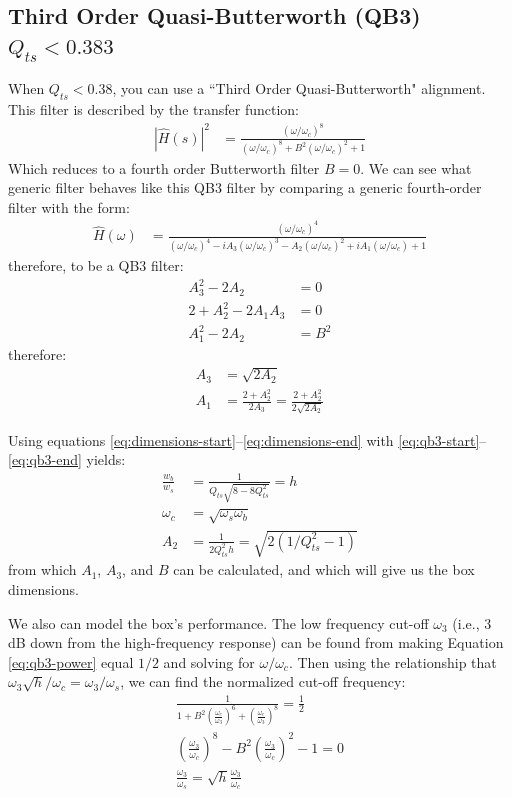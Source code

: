 \documentclass[10pt]{book}
\begin{document}
\subsection{Third Order Quasi-Butterworth (QB3) \texorpdfstring{\\$Q_{ts}<0.383$}{Qts<0.383}} When $Q_{ts}<0.38$, you can use a ``Third Order Quasi-Butterworth" alignment. This filter is described by the transfer function:
\begin{align}
\left| \hat{H}(s) \right|^2 &=\frac{(\omega/\omega_c)^8}{(\omega/\omega_c)^8+B^2(\omega/\omega_c)^2+1}
\end{align}
Which reduces to a fourth order Butterworth filter $B=0$. We can see what generic filter behaves like this QB3 filter by comparing a generic fourth-order filter with the form:
\begin{align}
\hat{H}(\omega) &=\frac{(\omega/\omega_c)^4}{(\omega/\omega_c)^4-iA_3(\omega/\omega_c)^3-A_2(\omega/\omega_c)^2+iA_1(\omega/\omega_c)+1}
\end{align}
therefore, to be a QB3 filter:
\begin{align}
A_3^2-2 A_2&=0\label{eq:qb3-start}\\
2+A_2^2-2 A_1 A_3&=0\\
A_1^2-2 A_2&=B^2\label{eq:qb3-end}
\end{align}
therefore:
\begin{align}
A_3&=\sqrt{2 A_2}\\
A_1&=\frac{2+A_2^2}{2 A_3}=\frac{2+A_2^2}{2 \sqrt{2 A_2}}
\end{align}

Using equations \ref{eq:dimensions-start}--\ref{eq:dimensions-end} with \ref{eq:qb3-start}--\ref{eq:qb3-end} yields:
\begin{align}
\frac{w_b}{w_s}&= \frac{1}{Q_{ts}\sqrt{8-8Q_{ts}^2}}=h\\
\omega_c&=\sqrt{\omega_s \omega_b}\\
A_2&=\frac{1}{2 Q_{ts}^2 h}=\sqrt{2(1/Q_{ts}^2-1)}\label{eq:qb3-power}
\end{align}
from which $A_1$, $A_3$, and $B$ can be calculated, and which will give us the box dimensions.

We also can model the box's performance. The low frequency cut-off $\omega_3$ (i.e., 3 dB down from the high-frequency response) can be found from making Equation \ref{eq:qb3-power} equal $1/2$ and solving for $\omega/\omega_c$. Then using the relationship that $\omega_3\sqrt{h}/\omega_c=\omega_3/\omega_s$, we can find the normalized cut-off frequency:
\begin{align}
\frac{1}{1+B^2\left( \frac{\omega_c}{\omega_3} \right)^6+\left( \frac{\omega_c}{\omega_3} \right)^8}=\frac{1}{2}\\
\left( \frac{\omega_3}{\omega_c} \right)^8-B^2\left( \frac{\omega_3}{\omega_c} \right)^2-1=0\\
\frac{\omega_3}{\omega_s}=\sqrt{h}\frac{\omega_3}{\omega_c}
\end{align}
\end{document}

